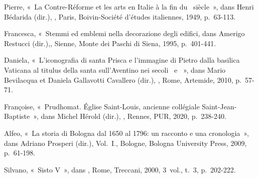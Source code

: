 \begin{teiElement}[name={TEI},change={commons\_edition}]
\begin{teiElement}[name={text},type={book},xmlid={book}]
\begin{teiElement}[name={group},type={book},xmlid={book-001}]
\begin{teiElement}[name={group},type={bibliography},data-page-title={Sources et bibliographie},data-include-href={Ch14\_Source\_bibliographie.xml},xmlid={bibliography-001}]
\begin{teiElement}[name={body}]
\begin{teiDiv}[type={section1},xmlid={div18}]
\begin{teiDiv}[type={section2},xmlid={div19}]
\begin{teiBibl}[xmlid={bibl-374}]
 Pierre, « La Contre-Réforme et les arts en Italie à la fin du  siècle », dans Henri Bédarida (dir.), , Paris, Boivin-Société d’études italiennes, 1949, p. 63-113.
\end{teiBibl}
              \begin{teiBibl}[xmlid={bibl-375}]
 Francesca, « Stemmi ed emblemi nella decorazione degli edifici, dans Amerigo Restucci (dir.),, Sienne, Monte dei Paschi di Siena, 1995, p. 401-441.
\end{teiBibl}
              \begin{teiBibl}[xmlid={bibl-376}]
 Daniela, « L’iconografia di santa Prisca e l’immagine di Pietro dalla basilica Vaticana al titulus della santa sull’Aventino nei secoli  e  », dans Mario Bevilacqua et Daniela Gallavotti Cavallero (dir.), , Rome, Artemide, 2010, p. 57-71.
\end{teiBibl}
              \begin{teiBibl}[xmlid={bibl-377}]
 Françoise, « Prudhomat. Église Saint-Louis, ancienne collégiale Saint-Jean-Baptiste », dans Michel Hérold (dir.), , Rennes, PUR, 2020, p. 238-240.
\end{teiBibl}
              \begin{teiBibl}[xmlid={bibl-378}]
 Alfeo, « La storia di Bologna dal 1650 al 1796: un racconto e una cronologia », dans Adriano Prosperi (dir.), Vol. I., Bologne, Bologna University Press, 2009, p. 61-198.
\end{teiBibl}
              \begin{teiBibl}[xmlid={bibl-379}]
 Silvano, « Sisto V », dans , Rome, Treccani, 2000, 3 vol., t. 3, p. 202-222.

\end{teiBibl}
\end{teiDiv}
\end{teiDiv}
\end{teiElement}
\end{teiElement}
\end{teiElement}
\end{teiElement}
\end{teiElement}
